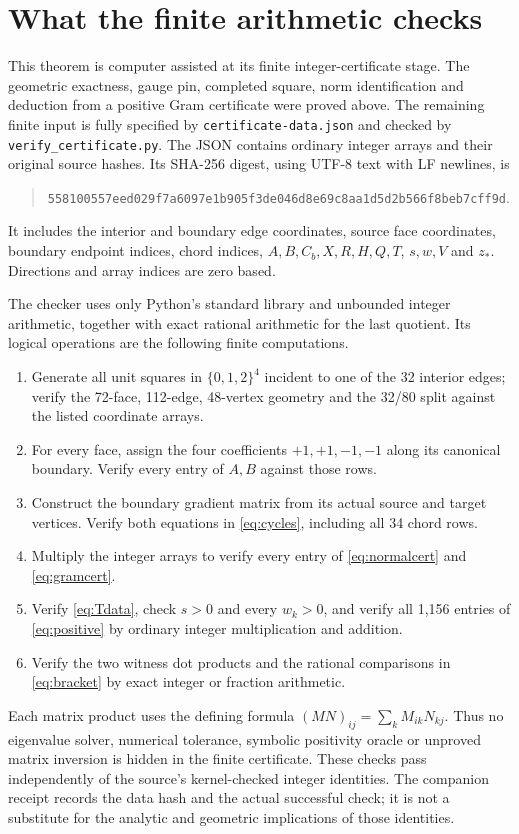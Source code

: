 \documentclass[11pt]{article}
\begin{document}
\section{What the finite arithmetic checks}\label{sec:checks}
This theorem is computer assisted at its finite integer-certificate stage.
The geometric exactness, gauge pin, completed square, norm identification
and deduction from a positive Gram certificate were proved above. The
remaining finite input is fully specified by
\texttt{certificate-data.json} and checked by \texttt{verify\_certificate.py}.
The JSON contains ordinary integer arrays and their original source hashes.
Its SHA-256 digest, using UTF-8 text with LF newlines, is
\begin{quote}\small\texttt{558100557eed029f7a6097e1b905f3de046d8e69c8aa1d5d2b566f8beb7cff9d}.\end{quote}
It includes the interior and boundary edge coordinates, source face
coordinates, boundary endpoint indices, chord indices, $A,B,C_b,X,R,H,Q,T$,
$s,w,V$ and $z_*$. Directions and array indices are zero based.

The checker uses only Python's standard library and unbounded integer
arithmetic, together with exact rational arithmetic for the last quotient.
Its logical operations are the following finite computations.
\begin{enumerate}
\item Generate all unit squares in $\{0,1,2\}^4$ incident to one of the
32 interior edges; verify the 72-face, 112-edge, 48-vertex geometry and the
32/80 split against the listed coordinate arrays.
\item For every face, assign the four coefficients $+1,+1,-1,-1$ along
its canonical boundary. Verify every entry of $A,B$ against those rows.
\item Construct the boundary gradient matrix from its actual source and
target vertices. Verify both equations in \eqref{eq:cycles}, including all
34 chord rows.
\item Multiply the integer arrays to verify every entry of
\eqref{eq:normalcert} and \eqref{eq:gramcert}.
\item Verify \eqref{eq:Tdata}, check $s>0$ and every $w_k>0$, and verify
all 1,156 entries of \eqref{eq:positive} by ordinary integer multiplication
and addition.
\item Verify the two witness dot products and the rational comparisons
in \eqref{eq:bracket} by exact integer or fraction arithmetic.
\end{enumerate}
Each matrix product uses the defining formula
$(MN)_{ij}=\sum_kM_{ik}N_{kj}$. Thus no eigenvalue solver, numerical tolerance,
symbolic positivity oracle or unproved matrix inversion is hidden in the
finite certificate. These checks pass independently of the source's
kernel-checked integer identities. The companion receipt records the data
hash and the actual successful check; it is not a substitute for the
analytic and geometric implications of those identities.
\end{document}
